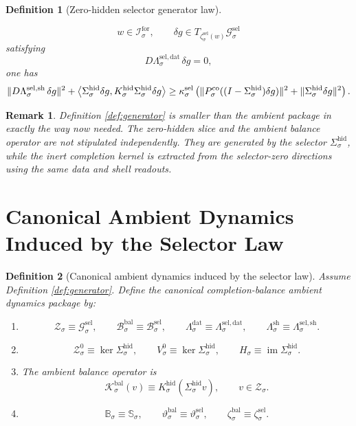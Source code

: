 \documentclass[11pt]{article}
\newcommand{\ForSpace}[1]{\mathcal I_{#1}^{\mathrm{for}}}
\newcommand{\BalSpace}[1]{\mathcal Z_{#1}}
\newcommand{\BalBody}[1]{\mathcal B_{#1}^{\mathrm{bal}}}
\newcommand{\BalData}[1]{\Lambda_{#1}^{\mathrm{dat}}}
\newcommand{\BalShell}[1]{\Lambda_{#1}^{\mathrm{sh}}}
\newcommand{\ZeroHiddenSlice}[1]{\mathcal Z_{#1}^{0}}
\newcommand{\ZeroHiddenVec}[1]{V_{#1}^{0}}
\newcommand{\BalOp}[1]{\mathcal K_{#1}^{\mathrm{bal}}}
\newcommand{\BalSym}[1]{\mathbb B_{#1}}
\newcommand{\BalTime}[1]{\vartheta_{#1}^{\mathrm{bal}}}
\newcommand{\BalEmbed}[1]{\zeta_{#1}^{\mathrm{bal}}}
\newcommand{\StateComp}[1]{P_{#1}^{\mathrm{co}}}
\newcommand{\GapSpace}[1]{H_{#1}}
\newcommand{\HiddenOperator}[1]{K_{#1}^{\mathrm{hid}}}
\newcommand{\GenSpace}[1]{\mathcal G_{#1}^{\mathrm{sel}}}
\newcommand{\GenBody}[1]{\mathcal B_{#1}^{\mathrm{sel}}}
\newcommand{\GenData}[1]{\Lambda_{#1}^{\mathrm{sel,dat}}}
\newcommand{\GenShell}[1]{\Lambda_{#1}^{\mathrm{sel,sh}}}
\newcommand{\HiddenSel}[1]{\Sigma_{#1}^{\mathrm{hid}}}
\newcommand{\GenSym}[1]{\mathbb S_{#1}}
\newcommand{\GenTime}[1]{\vartheta_{#1}^{\mathrm{sel}}}
\newcommand{\GenEmbed}[1]{\zeta_{#1}^{\mathrm{sel}}}
\newtheorem{definition}{Definition}
\newtheorem{remark}{Remark}
\begin{document}
\begin{definition}[Zero-hidden selector generator law]
\begin{enumerate}
    \[
    w\in\ForSpace{\sigma},
    \qquad
    \delta g\in T_{\GenEmbed{\sigma}(w)}\GenSpace{\sigma}
    \]
    satisfying
    \[
    D\GenData{\sigma}\,\delta g=0,
    \]
    one has
    \begin{equation}
    \|D\GenShell{\sigma}\,\delta g\|^{2}
    +
    \ev{
    \HiddenSel{\sigma}\delta g,
    \HiddenOperator{\sigma}\HiddenSel{\sigma}\delta g
    }
    \ge
    \kappa_{\sigma}^{\mathrm{sel}}
    \left(
    \|\StateComp{\sigma}( (I-\HiddenSel{\sigma})\delta g )\|^{2}
    +
    \|\HiddenSel{\sigma}\delta g\|^{2}
    \right).
    \label{eq:gencoercive}
    \end{equation}
\end{enumerate}
\end{definition}

\begin{remark}
Definition \ref{def:generator} is smaller than the ambient package in exactly the way now needed. The zero-hidden slice and the ambient balance operator are not stipulated independently. They are generated by the selector \(\HiddenSel{\sigma}\), while the inert completion kernel is extracted from the selector-zero directions using the same data and shell readouts.
\end{remark}

\section{Canonical Ambient Dynamics Induced by the Selector Law}

\begin{definition}[Canonical ambient dynamics induced by the selector law]
\label{def:canonical}
Assume Definition \ref{def:generator}. Define the canonical completion-balance ambient dynamics package by:
\begin{enumerate}
    \item
    \[
    \BalSpace{\sigma}\equiv\GenSpace{\sigma},
    \qquad
    \BalBody{\sigma}\equiv\GenBody{\sigma},
    \qquad
    \BalData{\sigma}\equiv\GenData{\sigma},
    \qquad
    \BalShell{\sigma}\equiv\GenShell{\sigma}.
    \]
    \item
    \[
    \ZeroHiddenSlice{\sigma}\equiv\ker\HiddenSel{\sigma},
    \qquad
    \ZeroHiddenVec{\sigma}\equiv\ker\HiddenSel{\sigma},
    \qquad
    \GapSpace{\sigma}\equiv\operatorname{im}\HiddenSel{\sigma}.
    \]
    \item The ambient balance operator is
    \begin{equation}
    \BalOp{\sigma}(v)
    \equiv
    \HiddenOperator{\sigma}(\HiddenSel{\sigma}v),
    \qquad
    v\in\BalSpace{\sigma}.
    \label{eq:balop}
    \end{equation}
    \item
    \[
    \BalSym{\sigma}\equiv\GenSym{\sigma},
    \qquad
    \BalTime{\sigma}\equiv\GenTime{\sigma},
    \qquad
    \BalEmbed{\sigma}\equiv\GenEmbed{\sigma}.
    \]
\end{enumerate}
\end{definition}
\end{document}
